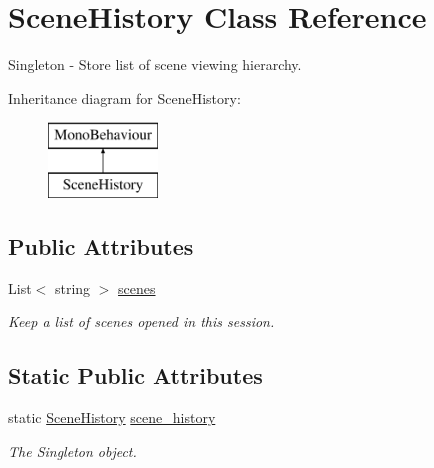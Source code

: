 \hypertarget{class_scene_history}{}\section{Scene\+History Class Reference}
\label{class_scene_history}


Singleton -\/ Store list of scene viewing hierarchy.  


Inheritance diagram for Scene\+History\+:\begin{figure}[H]
\begin{center}
\leavevmode
\includegraphics[height=2.000000cm]{class_scene_history}
\end{center}
\end{figure}
\subsection*{Public Attributes}
\begin{DoxyCompactItemize}
\item 
\mbox{\label{class_scene_history_a2795917d2bfcff8b698453e9ea474efc}} 
List$<$ string $>$ \mbox{\hyperlink{class_scene_history_a2795917d2bfcff8b698453e9ea474efc}{scenes}}
\begin{DoxyCompactList}\small\item\em Keep a list of scenes opened in this session. \end{DoxyCompactList}\end{DoxyCompactItemize}
\subsection*{Static Public Attributes}
\begin{DoxyCompactItemize}
\item 
\mbox{\label{class_scene_history_a66d1fc693a99eb7055349244fa233868}} 
static \mbox{\hyperlink{class_scene_history}{Scene\+History}} \mbox{\hyperlink{class_scene_history_a66d1fc693a99eb7055349244fa233868}{scene\+\_\+history}}
\begin{DoxyCompactList}\small\item\em The Singleton object. \end{DoxyCompactList}\end{DoxyCompactItemize}
